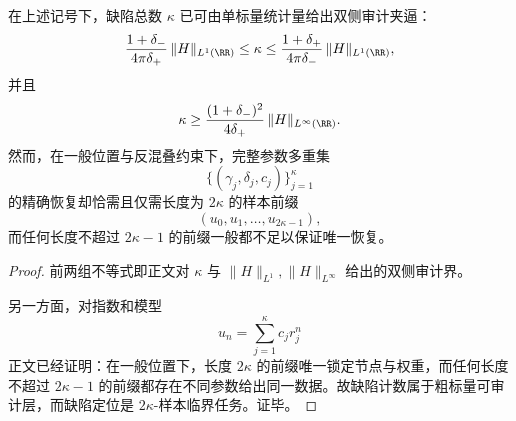 \begin{theorem}[缺陷计数与缺陷定位之间的严格复杂度裂缝]\label{thm:conclusion-comoving-defect-count-vs-localization-complexity-gap}
在上述记号下，缺陷总数 \(\kappa\) 已可由单标量统计量给出双侧审计夹逼：
\[
\frac{1+\delta_-}{4\pi\delta_+}\,\|H\|_{L^1(\RR)}
\le
\kappa
\le
\frac{1+\delta_+}{4\pi\delta_-}\,\|H\|_{L^1(\RR)},
\]
并且
\[
\kappa
\ge
\frac{(1+\delta_-)^2}{4\delta_+}\,\|H\|_{L^\infty(\RR)}.
\]
然而，在一般位置与反混叠约束下，完整参数多重集
\[
\{(\gamma_j,\delta_j,c_j)\}_{j=1}^{\kappa}
\]
的精确恢复却恰需且仅需长度为 \(2\kappa\) 的样本前缀
\[
(u_0,u_1,\dots,u_{2\kappa-1}),
\]
而任何长度不超过 \(2\kappa-1\) 的前缀一般都不足以保证唯一恢复。
\end{theorem}
\begin{proof}
前两组不等式即正文对 \(\kappa\) 与 \(\|H\|_{L^1},\|H\|_{L^\infty}\) 给出的双侧审计界。

另一方面，对指数和模型
\[
u_n=\sum_{j=1}^{\kappa}c_jr_j^n
\]
正文已经证明：在一般位置下，长度 \(2\kappa\) 的前缀唯一锁定节点与权重，而任何长度不超过 \(2\kappa-1\) 的前缀都存在不同参数给出同一数据。故缺陷计数属于粗标量可审计层，而缺陷定位是 \(2\kappa\)-样本临界任务。证毕。
\end{proof}

